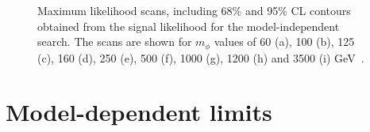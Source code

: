 \begin{figure}[p!]
\caption[Plots of the maximum likelihood scans for the model-independent search.]{Maximum likelihood scans, including 68\% and 95\% CL contours obtained from the signal likelihood for the model-independent search. The scans are shown for $m_{\phi}$ values of 60 (a), 100 (b), 125 (c), 160 (d), 250 (e), 500 (f), 1000 (g), 1200 (h) and 3500 (i) GeV~\cite{CMS:2022rbd}.}
\label{fig:2d_likelihood_scans}
\end{figure}

\section{Model-dependent limits}

